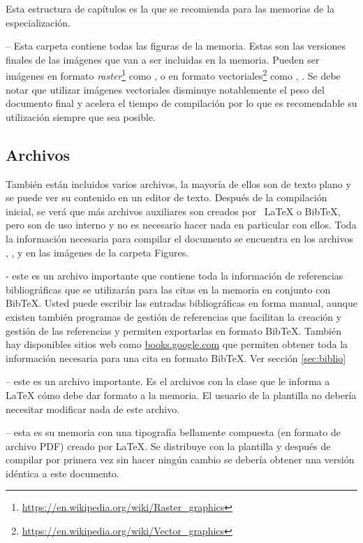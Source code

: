 Esta estructura de capítulos es la que se recomienda para las memorias de la
especialización.

 -- Esta carpeta contiene todas las figuras de la memoria.  Estas son las versiones finales de las imágenes que van a ser incluidas en la memoria.  Pueden ser imágenes en formato \textit{raster}\footnote{\url{https://en.wikipedia.org/wiki/Raster_graphics}} como ,  o en formato vectoriales\footnote{\url{https://en.wikipedia.org/wiki/Vector_graphics}} como , .  Se debe notar que utilizar imágenes vectoriales disminuye notablemente el peso del documento final y acelera el tiempo de compilación por lo que es recomendable su utilización siempre que sea posible.

\subsection{Archivos}

También están incluidos varios archivos, la mayoría de ellos son de texto plano
y se puede ver su contenido en un editor de texto. Después de la compilación
inicial, se verá que más archivos auxiliares son creados por \ LaTeX{} o
BibTeX, pero son de uso interno y no es necesario hacer nada en particular con
ellos. Toda la información necesaria para compilar el documento se encuentra en
los archivos , ,  y en las imágenes de la
carpeta Figures.

 - este es un archivo importante que contiene toda la información de referencias bibliográficas que se utilizarán para las citas en la memoria en conjunto con BibTeX. Usted puede escribir las entradas bibliográficas en forma manual, aunque existen también programas de gestión de referencias que facilitan la creación y gestión de las referencias y permiten exportarlas en formato BibTeX.  También hay disponibles sitios web como \url{books.google.com} que permiten obtener toda la información necesaria para una cita en formato BibTeX. Ver sección \ref{sec:biblio}

 -- este es un archivo importante. Es el archivos con la clase que le informa a \LaTeX{} cómo debe dar formato a la memoria. El usuario de la plantilla no debería necesitar modificar nada de este archivo.

 -- esta es su memoria con una tipografía bellamente compuesta (en formato de archivo PDF) creado por \LaTeX{}. Se distribuye con la plantilla y después de compilar por primera vez sin hacer ningún cambio se debería obtener una versión idéntica a este documento.

